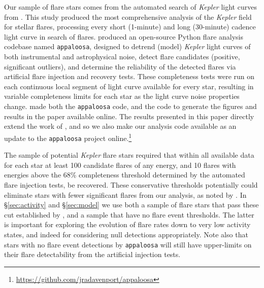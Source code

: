 \documentclass[preprint2]{aastex62}
\newcommand{\Kepler}{\textsl{Kepler}\xspace}
\begin{document}
Our sample of flare stars comes from the automated search of \Kepler light curves from \citet{davenport2016}. This study produced the most comprehensive analysis of the \Kepler field for stellar flares, processing every short (1-minute) and long (30-minute) cadence light curve in search of flares. \citet{davenport2016} produced an open-source Python flare analysis codebase named {\tt appaloosa}, designed to detrend (model) \Kepler light curves of both instrumental and astrophysical noise, detect flare candidates (positive, significant outliers), and determine the reliability of the detected flares via artificial flare injection and recovery tests. These completeness tests were run on each continuous local segment of light curve available for every star, resulting in variable completeness limits for each star as the light curve noise properties change. \citet{davenport2016} made both the {\tt appaloosa} code, and the code to generate the figures and results in the paper available online. The results presented in this paper directly extend the work of \citet{davenport2016}, and so we also make our analysis code available as an update to the {\tt appaloosa} project online.\footnote{\url{https://github.com/jradavenport/appaloosa}}


The \citet{davenport2016} sample of potential \Kepler flare stars required that within all available data for each star at least 100 candidate flares of any energy, and 10 flares with energies above the 68\% completeness threshold determined by the automated flare injection tests, be recovered. These conservative thresholds potentially could eliminate stars with fewer significant flares from our analysis, as noted by \citet{van-doorsselaere2017}. In \S\ref{sec:activity} and \S\ref{sec:model} we use both a sample of flare stars that pass these cut established by \citet{davenport2016}, and a sample that have no flare event thresholds. The latter is important for exploring the evolution of flare rates down to very low activity states, and indeed for considering null detections appropriately. Note also that stars with no flare event detections by {\tt appaloosa} will still have upper-limits on their flare detectability from the artificial injection tests.
\end{document}
